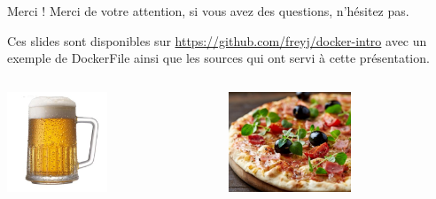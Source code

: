 \documentclass{beamer}
\begin{document}
\begin{frame}{Merci !}
    Merci de votre attention, si vous avez des questions, n'hésitez pas.
    
    Ces slides sont disponibles sur \href{https://github.com/freyj/}{https://github.com/freyj/docker-intro} 
    avec un exemple de DockerFile ainsi que les sources qui ont servi à cette présentation.
    
    \begin{columns}
        \begin{column}{0.5\textwidth}
            \includegraphics[height=3cm]{img/biere.jpg}
        \end{column}
        \begin{column}{0.5\textwidth}
            \includegraphics[height=3cm]{img/pizza.jpg}
        \end{column}
    \end{columns}
\end{frame}


\end{document}
